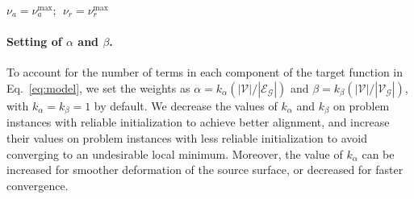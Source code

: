 \begin{algorithm}[!t]
\LinesNumbered
\label{Alg:total-alg}
\caption{Non-rigid registration}
$\nu_a=\nu_a^{\max};~~\nu_r = \nu_r^{\max}$\;
\end{algorithm}

\paragraph{Setting of $\alpha$ and $\beta$.} To account for the number of terms in each component of the target function in Eq.~\eqref{eq:model}, we set the weights as $\alpha=k_\alpha (|\mathcal{V}|/|\mathcal{E}_{\mathcal{G}}|)$ and $\beta= k_\beta (|\mathcal{V}|/|\mathcal{V}_{\mathcal{G}}|) $, with  $k_\alpha = k_\beta = 1$ by default. We decrease the values of $k_\alpha$ and $k_\beta$ on problem instances with reliable initialization to achieve better alignment, and increase their values on problem instances with less reliable initialization to avoid converging to an undesirable local minimum. Moreover, the value of $k_\alpha$ can be increased for smoother deformation of the source surface, or decreased for faster convergence.

